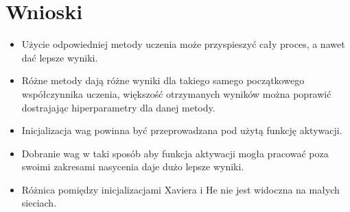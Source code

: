 \documentclass{article}
\begin{document}
\newpage
\section{Wnioski}

\begin{itemize}
	\item Użycie odpowiedniej metody uczenia może przyspieszyć cały proces, a nawet dać lepsze wyniki.
	\item Różne metody dają różne wyniki dla takiego samego początkowego współczynnika uczenia, większość otrzymanych wyników można poprawić dostrajając hiperparametry dla danej metody.
	\item Inicjalizacja wag powinna być przeprowadzana pod użytą funkcję aktywacji.
	\item Dobranie wag w taki sposób aby funkcja aktywacji mogła pracować poza swoimi zakresami nasycenia daje dużo lepsze wyniki.
	\item Różnica pomiędzy inicjalizacjami Xaviera i He nie jest widoczna na małych sieciach.
\end{itemize}
\end{document}
